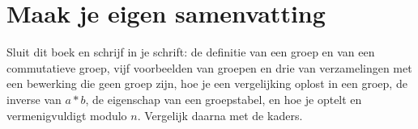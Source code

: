 
\ifzelfstudie
\section*{Maak je eigen samenvatting}
Sluit dit boek en schrijf in je schrift: de definitie van een groep en van een commutatieve groep, vijf voorbeelden van groepen en drie van verzamelingen met een bewerking die geen groep zijn, hoe je een vergelijking oplost in een groep, de inverse van $a \ast b$, de eigenschap van een groepstabel, en hoe je optelt en vermenigvuldigt modulo $n$. Vergelijk daarna met de kaders.
\fi
